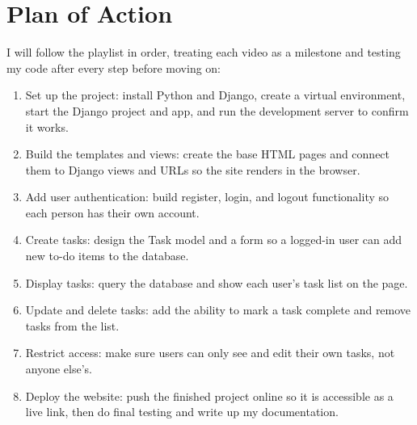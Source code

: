 \documentclass[11pt]{article}
\begin{document}
\section{Plan of Action}
I will follow the playlist in order, treating each video as a milestone and testing my code after every step before moving on:
\begin{enumerate}
  \item Set up the project: install Python and Django, create a virtual environment, start the Django project and app, and run the development server to confirm it works.
  \item Build the templates and views: create the base HTML pages and connect them to Django views and URLs so the site renders in the browser.
  \item Add user authentication: build register, login, and logout functionality so each person has their own account.
  \item Create tasks: design the Task model and a form so a logged-in user can add new to-do items to the database.
  \item Display tasks: query the database and show each user's task list on the page.
  \item Update and delete tasks: add the ability to mark a task complete and remove tasks from the list.
  \item Restrict access: make sure users can only see and edit their own tasks, not anyone else's.
  \item Deploy the website: push the finished project online so it is accessible as a live link, then do final testing and write up my documentation.
\end{enumerate}
\end{document}

